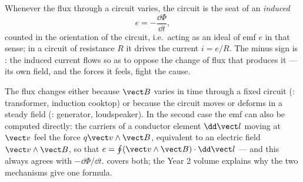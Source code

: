 \begin{theorem}\label{thm:b1:induction:faraday}
Whenever the flux through a circuit varies, the circuit is the seat of
an \emph{induced }
\[
e = -\frac{\dd\Phi}{\dd t} ,
\]
counted in the orientation of the circuit, i.e.\ acting as an ideal
 of emf $e$ in that sense; in a circuit of resistance $R$
it drives the current $i = e/R$. The minus sign is \emph{}:
the induced current flows so as to oppose the change of flux that
produces it --- its own field, and the forces it feels, fight the cause.
\end{theorem}
\admitted

\begin{remark}\label{rem:b1:induction:twofaces}
The flux changes either because $\vect B$ varies in time through a
fixed circuit (\emph{}: transformer, induction cooktop)
or because the circuit moves or deforms in a steady field
(\emph{}: generator, loudspeaker). In the second case
the emf can also be computed directly: the carriers of a conductor
element $\dd\vect l$ moving at $\vect v$ feel the force $q\vect v\wedge
\vect B$, equivalent to an electric field $\vect v\wedge\vect B$, so that
$e = \oint(\vect v\wedge\vect B)\cdot\dd\vect l$ --- and this always agrees
with $-\dd\Phi/\dd t$.  covers both; the Year 2 volume
explains why the two mechanisms give one formula.
\end{remark}

